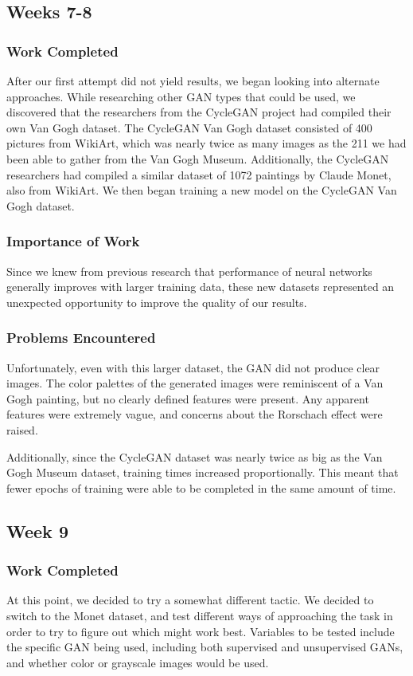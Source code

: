 \documentclass[12pt,letterpaper]{article}
\begin{document}
	\subsection{Weeks 7-8}
	\subsubsection{Work Completed}
	After our first attempt did not yield results, we began looking into alternate approaches.
	While researching other GAN types that could be used, we discovered that the researchers from the CycleGAN\cite{CycleGAN2017}\cite{isola2017image} project had compiled their own Van Gogh dataset.
	The CycleGAN Van Gogh dataset consisted of 400 pictures from WikiArt\cite{wikiartVanGogh}, which was nearly twice as many images as the 211 we had been able to gather from the Van Gogh Museum.
	Additionally, the CycleGAN researchers had compiled a similar dataset of 1072 paintings by Claude Monet, also from WikiArt.
	We then began training a new model on the CycleGAN Van Gogh dataset.
	\subsubsection{Importance of Work}
	Since we knew from previous research that performance of neural networks generally improves with larger training data, these new datasets represented an unexpected opportunity to improve the quality of our results.
	\subsubsection{Problems Encountered}
	Unfortunately, even with this larger dataset, the GAN did not produce clear images.
	The color palettes of the generated images were reminiscent of a Van Gogh painting, but no clearly defined features were present.
	Any apparent features were extremely vague, and concerns about the Rorschach effect were raised.

	Additionally, since the CycleGAN dataset was nearly twice as big as the Van Gogh Museum dataset, training times increased proportionally.
	This meant that fewer epochs of training were able to be completed in the same amount of time.

	\subsection{Week 9}
	\subsubsection{Work Completed}
	At this point, we decided to try a somewhat different tactic.
	We decided to switch to the Monet dataset, and test different ways of approaching the task in order to try to figure out which might work best.
	Variables to be tested include the specific GAN being used, including both supervised and unsupervised GANs, and whether color or grayscale images would be used.
\end{document}
